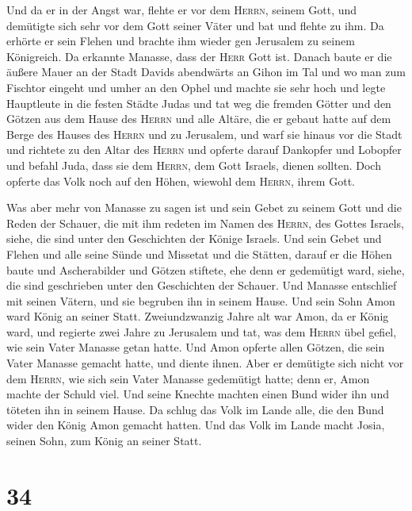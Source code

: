 Und da er in der Angst war, flehte er vor dem
\textsc{Herrn}, seinem Gott, und demütigte sich sehr vor dem Gott seiner
Väter  und bat und flehte zu ihm. Da erhörte er sein
Flehen und brachte ihm wieder gen Jerusalem zu seinem Königreich. Da
erkannte Manasse, dass der \textsc{Herr} Gott ist. 
Danach baute er die äußere Mauer an der Stadt Davids abendwärts an Gihon
im Tal und wo man zum Fischtor eingeht und umher an den Ophel und machte
sie sehr hoch und legte Hauptleute in die festen Städte Judas
 und tat weg die fremden Götter und den Götzen aus dem
Hause des \textsc{Herrn} und alle Altäre, die er gebaut hatte auf dem
Berge des Hauses des \textsc{Herrn} und zu Jerusalem, und warf sie
hinaus vor die Stadt  und richtete zu den Altar des
\textsc{Herrn} und opferte darauf Dankopfer und Lobopfer und befahl
Juda, dass sie dem \textsc{Herrn}, dem Gott Israels, dienen sollten.
 Doch opferte das Volk noch auf den Höhen, wiewohl dem
\textsc{Herrn}, ihrem Gott.

 Was aber mehr von Manasse zu sagen ist und sein Gebet zu
seinem Gott und die Reden der Schauer, die mit ihm redeten im Namen des
\textsc{Herrn}, des Gottes Israels, siehe, die sind unter den
Geschichten der Könige Israels.  Und sein Gebet und
Flehen und alle seine Sünde und Missetat und die Stätten, darauf er die
Höhen baute und Ascherabilder und Götzen stiftete, ehe denn er
gedemütigt ward, siehe, die sind geschrieben unter den Geschichten der
Schauer.  Und Manasse entschlief mit seinen Vätern, und
sie begruben ihn in seinem Hause. Und sein Sohn Amon ward König an
seiner Statt.  Zweiundzwanzig Jahre alt war Amon, da er
König ward, und regierte zwei Jahre zu Jerusalem  und
tat, was dem \textsc{Herrn} übel gefiel, wie sein Vater Manasse getan
hatte. Und Amon opferte allen Götzen, die sein Vater Manasse gemacht
hatte, und diente ihnen.  Aber er demütigte sich nicht
vor dem \textsc{Herrn}, wie sich sein Vater Manasse gedemütigt hatte;
denn er, Amon machte der Schuld viel.  Und seine Knechte
machten einen Bund wider ihn und töteten ihn in seinem Hause.
 Da schlug das Volk im Lande alle, die den Bund wider den
König Amon gemacht hatten. Und das Volk im Lande macht Josia, seinen
Sohn, zum König an seiner Statt.

\hypertarget{section-33}{%
\section{34}\label{section-33}}

